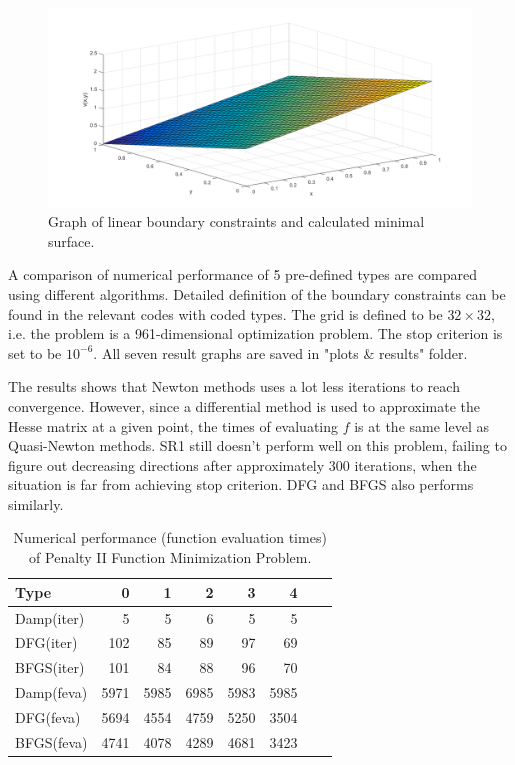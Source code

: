 \documentclass{article}
\begin{document}
\begin{figure}[ht]
\label{fig3}
\vskip 0.2in
\begin{center}
\centerline{\includegraphics[width=\columnwidth]{rst}}
\caption{Graph of linear boundary constraints and calculated minimal surface.}
\end{center}
\vskip -0.2in
\end{figure}

A comparison of numerical performance of 5 pre-defined types are compared using different algorithms. Detailed definition of the boundary constraints can be found in the relevant codes with coded types. The grid is defined to be $32 \times 32$, i.e. the problem is a 961-dimensional optimization problem. The stop criterion is set to be $10^{-6}$. All seven result graphs are saved in "plots \& results" folder.

The results shows that Newton methods uses a lot less iterations to reach convergence. However, since a differential method is used to approximate the Hesse matrix at a given point, the times of evaluating $f$ is at the same level as Quasi-Newton methods. SR1 still doesn't perform well on this problem, failing to figure out decreasing directions after approximately 300 iterations, when the situation is far from achieving stop criterion.
DFG and BFGS also performs similarly.

\begin{table}[t]
\caption{Numerical performance (function evaluation times) of Penalty II Function Minimization Problem.}
\label{tab4}
\vskip 0.15in
\begin{center}
\begin{small}
\begin{sc}
\begin{tabular}{lrrrrrrr}
\toprule
Type & 0 & 1 & 2 & 3 & 4 \\
\midrule
Damp(iter)    & 5 & 5 & 6 & 5 & 5 \\
DFG(iter) & 102 & 85 & 89 & 97 & 69 \\
BFGS(iter)   & 101 & 84 & 88 & 96 & 70 \\
Damp(feva)   & 5971 & 5985 & 6985 & 5983 & 5985 \\
DFG(feva)   & 5694 & 4554 & 4759 & 5250 & 3504 \\
BFGS(feva)  & 4741 & 4078 & 4289 & 4681 & 3423 \\
\bottomrule
\end{tabular}
\end{sc}
\end{small}
\end{center}
\vskip -0.1in
\end{table}
\end{document}

